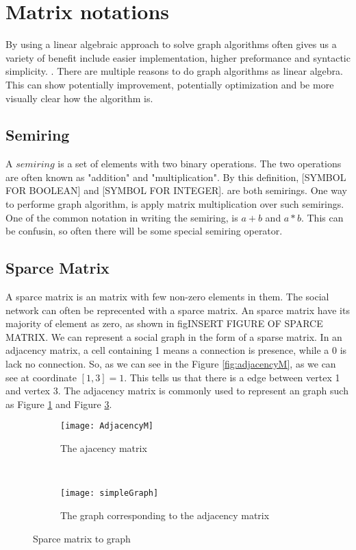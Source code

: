 \section{Matrix notations}
By using a linear algebraic approach to solve graph algorithms often gives us a variety of benefit include easier implementation, higher preformance and syntactic simplicity. \cite{MathToAlgo}. There are multiple reasons to do graph algorithms as linear algebra. This can show potentially improvement, potentially optimization and be more visually clear how the algorithm is. 


\subsection{Semiring}
A $semiring$ is a set of elements with two binary operations. The two operations are often known as "addition" and "multiplication". By this definition, [SYMBOL FOR BOOLEAN] and [SYMBOL FOR INTEGER]. are both semirings.  One way to performe graph algorithm, is apply matrix multiplication over such semirings. One of the common notation in writing the semiring, is $a+b$ and $a \ast b$. This can be confusin, so often there will be some special semiring operator.

\subsection{Sparce Matrix}
A sparce matrix is an matrix with few non-zero elements in them. The social network can often be reprecented with a sparce matrix. An sparce matrix have its majority of element as zero, as shown in fig{INSERT FIGURE OF SPARCE MATRIX}. We can represent a social graph in the form of a sparse matrix. In an adjacency matrix, a cell containing 1 means a connection is presence, while a 0 is lack no connection. So, as we can see in the Figure \ref{fig:adjacencyM}, as we can see at coordinate $[1,3] = 1$. This tells us that there is a edge between vertex 1 and vertex 3. The adjacency matrix is commonly used to represent an graph such as Figure \ref{fig:AdjacencyM} and Figure \ref{fig:matrix}.

\begin{figure}
	\begin{subfigure}{0.5\textwidth}
	\texttt{[image: AdjacencyM]}
	\caption{The ajacency matrix}
	\label{fig:AdjacencyM}
	\end{subfigure}
	~
	\begin{subfigure}{0.5\textwidth}
	\texttt{[image: simpleGraph]}
	\caption{The graph corresponding to the adjacency matrix}
	\label{fig:matrix}
	\end{subfigure}
 	\caption{Sparce matrix to graph}
\end{figure}

